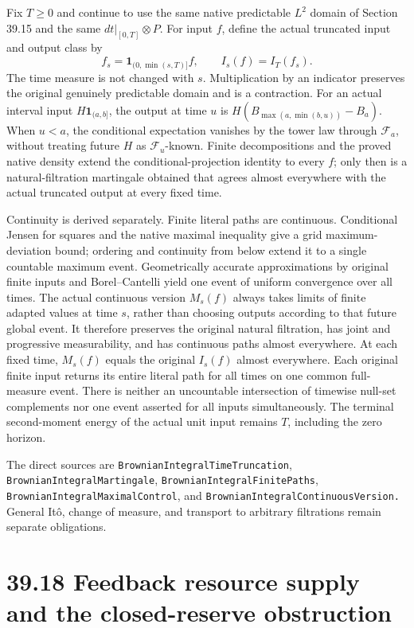 \documentclass[
  english,
  11pt,
  oneside]{book}
\begin{document}
Fix \(T\ge0\) and continue to use the same native predictable \(L^2\) domain of Section 39.15 and the same \(dt|_{[0,T]}\otimes P\). For input \(f\), define the actual truncated input and output class by \[f_s=\mathbf1_{(0,\min(s,T)]}f,\qquad I_s(f)=I_T(f_s).\] The time measure is not changed with \(s\). Multiplication by an indicator preserves the original genuinely predictable domain and is a contraction. For an actual interval input \(H\mathbf1_{(a,b]}\), the output at time \(u\) is \(H(B_{\max(a,\min(b,u))}-B_a)\). When \(u<a\), the conditional expectation vanishes by the tower law through \(\mathcal F_a\), without treating future \(H\) as \(\mathcal F_u\)-known. Finite decompositions and the proved native density extend the conditional-projection identity to every \(f\); only then is a natural-filtration martingale obtained that agrees almost everywhere with the actual truncated output at every fixed time.

Continuity is derived separately. Finite literal paths are continuous. Conditional Jensen for squares and the native maximal inequality give a grid maximum-deviation bound; ordering and continuity from below extend it to a single countable maximum event. Geometrically accurate approximations by original finite inputs and Borel--Cantelli yield one event of uniform convergence over all times. The actual continuous version \(M_s(f)\) always takes limits of finite adapted values at time \(s\), rather than choosing outputs according to that future global event. It therefore preserves the original natural filtration, has joint and progressive measurability, and has continuous paths almost everywhere. At each fixed time, \(M_s(f)\) equals the original \(I_s(f)\) almost everywhere. Each original finite input returns its entire literal path for all times on one common full-measure event. There is neither an uncountable intersection of timewise null-set complements nor one event asserted for all inputs simultaneously. The terminal second-moment energy of the actual unit input remains \(T\), including the zero horizon.

The direct sources are \nolinkurl{BrownianIntegralTimeTruncation}, \nolinkurl{BrownianIntegralMartingale}, \nolinkurl{BrownianIntegralFinitePaths}, \nolinkurl{BrownianIntegralMaximalControl}, and \nolinkurl{BrownianIntegralContinuousVersion.} General Itô, change of measure, and transport to arbitrary filtrations remain separate obligations.

\section{39.18 Feedback resource supply and the closed-reserve obstruction}\label{feedback-resource-supply-and-the-closed-reserve-obstruction}
\end{document}
